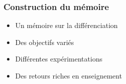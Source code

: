 \begin{frame}
    \frametitle{Construction du mémoire}
    \begin{itemize}
        \item Un mémoire sur la différenciation
        \item Des objectifs variés
        \item Différentes expérimentations
        \item Des retours riches en enseignement
    \end{itemize}
\end{frame}
